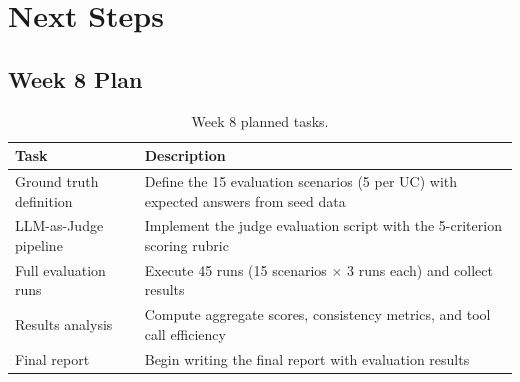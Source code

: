 \documentclass[12pt,a4paper]{report}
\begin{document}
\chapter{Next Steps}

\section{Week 8 Plan}

\begin{table}[H]
\centering\small
\caption{Week 8 planned tasks.}
\begin{tabularx}{\textwidth}{@{} l X @{}}
\toprule
\textbf{Task} & \textbf{Description} \\
\midrule
Ground truth definition & Define the 15 evaluation scenarios (5 per UC) with expected answers from seed data \\
LLM-as-Judge pipeline   & Implement the judge evaluation script with the 5-criterion scoring rubric \\
Full evaluation runs     & Execute 45 runs (15 scenarios $\times$ 3 runs each) and collect results \\
Results analysis         & Compute aggregate scores, consistency metrics, and tool call efficiency \\
Final report             & Begin writing the final report with evaluation results \\
\bottomrule
\end{tabularx}
\end{table}
\end{document}

